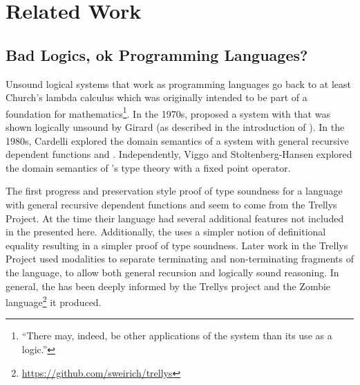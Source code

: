 \section{Related Work}
 
\subsection{Bad Logics, ok Programming Languages?}
 
Unsound logical systems that work as programming languages go back to at least Church's lambda calculus which was originally intended to be part of a foundation for mathematics\footnote{
  ``There may, indeed, be other applications of the system than its use as a logic.''\cite[p.349]{10.2307/1968337}
}.
In the 1970s, \MartinL{} proposed a system with \tit{}\cite{Martin-Lof-1971} that was shown logically unsound by Girard (as described in the introduction of \cite{Martin-Lof-1972}).
In the 1980s, Cardelli explored the domain semantics of a system with general recursive dependent functions and \tit{}\cite{cardelli1986polymorphic}.
Independently, Viggo and Stoltenberg-Hansen\cite{PALMGREN1990135} explored the domain semantics of \MartinL{}'s type theory with a fixed point operator.

The first progress and preservation style proof of type soundness for a language with general recursive dependent functions and \tit{} seem to come from the Trellys Project\cite{sjoberg2012irrelevance}.
At the time their language had several additional features not included in the \slang{} presented here.
Additionally, the \slang{} uses a simpler notion of definitional equality resulting in a simpler proof of type soundness.
Later work in the Trellys Project\cite{casinghino2014combining,casinghino2014combiningthesis} used modalities to separate terminating and non-terminating fragments of the language, to allow both general recursion and logically sound reasoning. %
In general, the \slang{} has been deeply informed by the Trellys project\cite{sjoberg2012irrelevance,casinghino2014combining,casinghino2014combiningthesis,sjoberg2015programming,sjoberg2015dependently} and the Zombie language\footnote{
  \url{https://github.com/sweirich/trellys}
} it produced.
 
 
